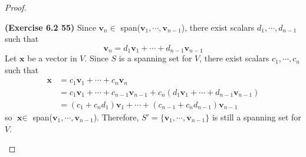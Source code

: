 \begin{proof}
\begin{enumerate}
		\textbf{(Exercise 6.2 55)} Since $\textbf{v}_n \in $ span($\textbf{v}_1, \cdots, \textbf{v}_{n-1}$), there exist scalars $d_1, \cdots, d_{n-1}$ such that \begin{equation*}
			\textbf{v}_n = d_1\textbf{v}_1 + \cdots + d_{n-1}\textbf{v}_{n-1}
		\end{equation*} Let $\textbf{x}$ be a vector in $V$. Since $S$ is a spanning set for $V$, there exist scalars $c_1, \cdots, c_n$ such that \begin{align*}
			\textbf{x} &= c_1\textbf{v}_1 + \cdots + c_n\textbf{v}_n \\
			&= c_1\textbf{v}_1 + \cdots + c_{n-1}\textbf{v}_{n-1} + c_n( d_1\textbf{v}_1 + \cdots + d_{n-1}\textbf{v}_{n-1}) \\
			&= (c_1 + c_nd_1)\textbf{v}_1 + \cdots + (c_{n-1} + c_nd_{n-1})\textbf{v}_{n-1}
		\end{align*} so $\textbf{x} \in $ span($\textbf{v}_1, \cdots, \textbf{v}_{n-1}$). Therefore, $S' = \{ \textbf{v}_1, \cdots, \textbf{v}_{n-1} \}$ is still a spanning set for $V$. \\
		

\end{enumerate}
\end{proof}
